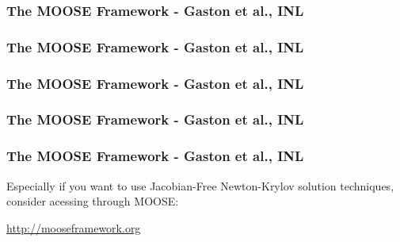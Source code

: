 \frame
{
  \frametitle{The MOOSE Framework - Gaston et al., INL}
  \begin{center}
  \end{center}
}



\frame
{
  \frametitle{The MOOSE Framework - Gaston et al., INL}
  \begin{center}
  \end{center}
}



\frame
{
  \frametitle{The MOOSE Framework - Gaston et al., INL}
  \begin{center}
  \end{center}
}



\frame
{
  \frametitle{The MOOSE Framework - Gaston et al., INL}
  \begin{center}
  \end{center}
}



\frame
{
  \frametitle{The MOOSE Framework - Gaston et al., INL}
  \begin{center}
    \large
    \vspace{2em}

    Especially if you want to use Jacobian-Free Newton-Krylov solution techniques, consider acessing \libmesh{} through MOOSE:
    \vspace{1em}

    \url{http://mooseframework.org}
  \end{center}
}
